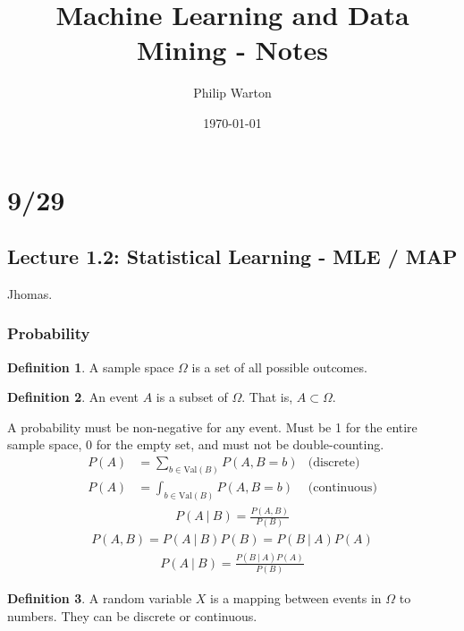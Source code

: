 \documentclass{article}
\theoremstyle{definition}
\newtheorem{definition}{Definition}[section]
\begin{document}
\title{Machine Learning and Data Mining - Notes}
\author{Philip Warton}
\date{\today}
\maketitle
\section{9/29}
\subsection{Lecture 1.2: Statistical Learning - MLE / MAP}
Jhomas.
    \subsubsection{Probability}
        \begin{mdframed}[]
            \begin{definition}
                A sample space $\Omega$ is a set of all possible outcomes.
            \end{definition}
            \begin{definition}
                An event $A$ is a subset of $\Omega$. That is, $A \subset \Omega$.
            \end{definition}
        \end{mdframed}
        A probability must be non-negative for any event. Must be 1 for the entire sample space, 0 for the empty set, and must 
        not be double-counting.\\
        \begin{align}
            P(A) &= \sum_{b \in \text{Val}(B)}P(A,B = b) & \text{(discrete)}\\
            P(A) &= \int_{b \in \text{Val}(B)}P(A,B = b) & \text{(continuous)}
        \end{align}
        \begin{align}
            P(A \ | \ B) = \frac{P(A,B)}{P(B)}
        \end{align}
        \begin{align}
            P(A,B) = P(A \ | \ B)P(B) = P(B\ |\ A)P(A)
        \end{align}
        \begin{align}
            P(A \ | \ B) = \frac{P(B \ | \ A)P(A)}{P(B)}
        \end{align}
        \begin{mdframed}[]
            \begin{definition}
                A random variable $X$ is a mapping between events in $\Omega$ to numbers. They can be discrete or continuous.
            \end{definition}
        \end{mdframed}
\end{document}
